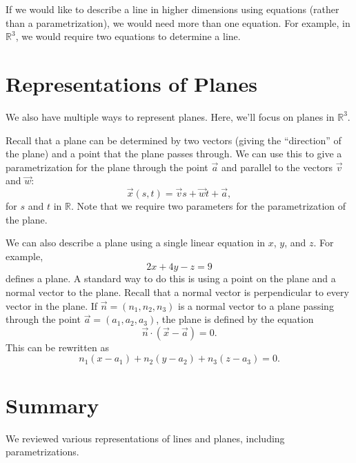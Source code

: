 \documentclass{ximera}
\begin{document}
 If we would like to describe a line in higher dimensions using equations (rather than a parametrization), we would need more than one equation. For example, in $\mathbb{R}^3$, we would require two equations to determine a line.
 
 \section*{Representations of Planes}
 
 We also have multiple ways to represent planes. Here, we'll focus on planes in $\mathbb{R}^3$.
 
 Recall that a plane can be determined by two vectors (giving the ``direction'' of the plane) and a point that the plane passes through. We can use this to give a parametrization for the plane through the point $\vec{a}$ and parallel to the vectors $\vec{v}$ and $\vec{w}$:
 \[
 \vec{x}(s,t) = \vec{v}s+\vec{w}t + \vec{a},
 \]
 for $s$ and $t$ in $\mathbb{R}$. Note that we require two parameters for the parametrization of the plane.

We can also describe a plane using a single linear equation in $x$, $y$, and $z$. For example,
\[
2x+4y-z=9
\]
defines a plane. A standard way to do this is using a point on the plane and a normal vector to the plane. Recall that a normal vector is perpendicular to every vector in the plane. If $\vec{n}=(n_1,n_2,n_3)$ is a normal vector to a plane passing through the point $\vec{a}=(a_1,a_2,a_3)$, the plane is defined by the equation
\[
\vec{n}\cdot(\vec{x}-\vec{a})=0.
\]
This can be rewritten as
\[
n_1(x-a_1)+n_2(y-a_2)+n_3(z-a_3)=0.
\]

\section*{Summary}

We reviewed various representations of lines and planes, including parametrizations.
\end{document}
